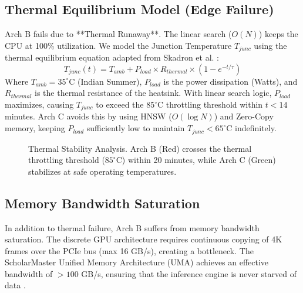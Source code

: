 \documentclass[conference]{IEEEtran}
\begin{document}
\subsection{Thermal Equilibrium Model (Edge Failure)}
Arch B fails due to **Thermal Runaway**. The linear search ($O(N)$) keeps the CPU at 100\% utilization. We model the Junction Temperature $T_{junc}$ using the thermal equilibrium equation adapted from Skadron et al. \cite{b7}:
\begin{equation}
T_{junc}(t) = T_{amb} + P_{load} \times R_{thermal} \times (1 - e^{-t/\tau})
\end{equation}
Where $T_{amb}=35^\circ$C (Indian Summer), $P_{load}$ is the power dissipation (Watts), and $R_{thermal}$ is the thermal resistance of the heatsink.
With linear search logic, $P_{load}$ maximizes, causing $T_{junc}$ to exceed the $85^\circ$C throttling threshold within $t < 14$ minutes. Arch C avoids this by using HNSW ($O(\log N)$) and Zero-Copy memory, keeping $P_{load}$ sufficiently low to maintain $T_{junc} < 65^\circ$C indefinitely.

\begin{figure}[htbp]
\centering
{}
\caption{Thermal Stability Analysis. Arch B (Red) crosses the thermal throttling threshold ($85^\circ$C) within 20 minutes, while Arch C (Green) stabilizes at safe operating temperatures.}
\label{fig:thermal}
\end{figure}

\subsection{Memory Bandwidth Saturation}
In addition to thermal failure, Arch B suffers from memory bandwidth saturation. The discrete GPU architecture requires continuous copying of 4K frames over the PCIe bus (max 16 GB/s), creating a bottleneck. The ScholarMaster Unified Memory Architecture (UMA) achieves an effective bandwidth of $>100$ GB/s, ensuring that the inference engine is never starved of data \cite{b20}.
\end{document}
